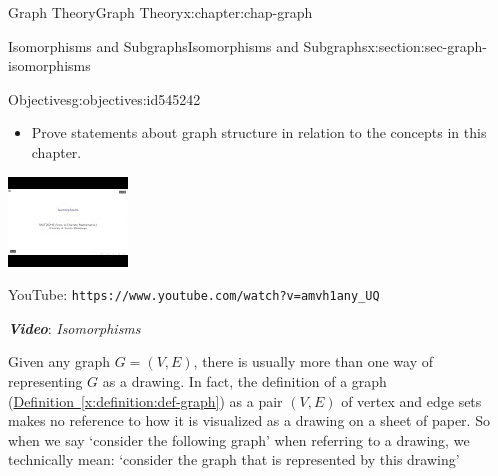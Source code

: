 \documentclass[oneside,10pt,]{book}
\newcommand{\xreffont}{\relax}
\newcommand{\mono}[1]{\texttt{#1}}
\newcommand{\alert}[1]{\textbf{\textit{#1}}}
\numberwithin{equation}{section}
\newlength{\qrsize}
\newlength{\previewwidth}
\begin{document}
\begin{chapterptx}{Graph Theory}{}{Graph Theory}{}{}{x:chapter:chap-graph}
\begin{sectionptx}{Isomorphisms and Subgraphs}{}{Isomorphisms and Subgraphs}{}{}{x:section:sec-graph-isomorphisms}
\begin{objectives}{Objectives}{g:objectives:id545242}
\begin{itemize}[label=\textbullet]
\item{}Prove statements about graph structure in relation to the concepts in this chapter.%
\end{itemize}
\end{objectives}
\begin{sidebyside}{1}{0}{0}{0}%
\begin{sbspanel}{1}%
\setlength{\qrsize}{9em}
\setlength{\previewwidth}{\linewidth}
\addtolength{\previewwidth}{-\qrsize}
\begin{tcbraster}[raster columns=2, raster column skip=1pt, raster halign=center, raster force size=false, raster left skip=0pt, raster right skip=0pt]%
\begin{tcolorbox}[previewstyle, width=\previewwidth]%
\includegraphics[width=0.80\linewidth,height=\qrsize,keepaspectratio]{images/video-isomoprhism.jpg}%
\end{tcolorbox}%
\begin{tcolorbox}[qrstyle]%
{\hypersetup{urlcolor=black}}%
\end{tcolorbox}%
\begin{tcolorbox}[captionstyle]%
\small YouTube: \mono{https://www.youtube.com/watch?v=amvh1any\_UQ}\end{tcolorbox}%
\end{tcbraster}%
\end{sbspanel}%
\end{sidebyside}%
\par
\alert{Video}: \emph{Isomorphisms}%
\par
Given any graph \(G = (V,E)\), there is usually more than one way of representing \(G\) as a drawing. In fact, the definition of a graph (\hyperref[x:definition:def-graph]{Definition~{\xreffont\ref{x:definition:def-graph}}}) as a pair \((V,E)\) of vertex and edge sets makes no reference to how it is visualized as a drawing on a sheet of paper. So when we say `consider the following graph' when referring to a drawing, we technically mean: `consider the graph that is represented by this drawing\textellipsis{}'%

\end{sectionptx}
\end{chapterptx}
\end{document}
